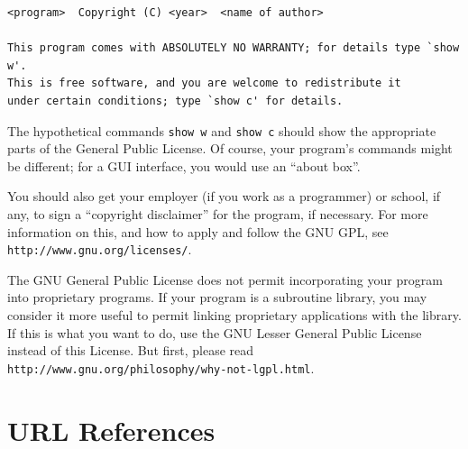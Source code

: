 \documentclass[12pt,a4paper]{book}
\begin{document}
\begin{enumerate}
{\footnotesize
\begin{verbatim}
<program>  Copyright (C) <year>  <name of author>

This program comes with ABSOLUTELY NO WARRANTY; for details type `show w'.
This is free software, and you are welcome to redistribute it
under certain conditions; type `show c' for details.
\end{verbatim}
}

The hypothetical commands {\tt show w} and {\tt show c} should show
the appropriate
parts of the General Public License.  Of course, your program's commands
might be different; for a GUI interface, you would use an ``about box''.

You should also get your employer (if you work as a programmer) or
school, if any, to sign a ``copyright disclaimer'' for the program, if
necessary.  For more information on this, and how to apply and follow
the GNU GPL, see \texttt{http://www.gnu.org/licenses/}.

The GNU General Public License does not permit incorporating your
program into proprietary programs.  If your program is a subroutine
library, you may consider it more useful to permit linking proprietary
applications with the library.  If this is what you want to do, use
the GNU Lesser General Public License instead of this License.  But
first, please read \texttt{http://www.gnu.org/philosophy/why-not-lgpl.html}.

\end{enumerate}

\chapter{URL References}
\label{URL REF}
\end{document}
